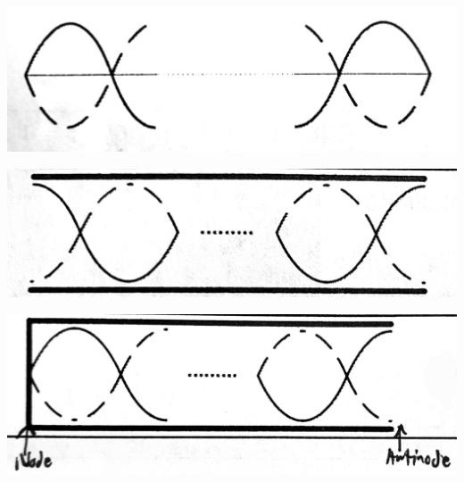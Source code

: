 \documentclass[oneside]{book}
\begin{document}
\begin{itemize}
\begin{minipage}{0.3\textwidth}
\begin{center}
            \includegraphics[scale=0.1]{../images/StringStatWaves.jpg}
            \captionsetup{type=figure}
        \end{center}
    \end{minipage}
    \begin{minipage}{0.3\textwidth}
        \begin{center}
            \hypertarget{Fig 12.3}{}
            \includegraphics[scale=0.1]{../images/Open Pipe.jpg}
            \captionsetup{type=figure}
        \end{center}
    \end{minipage}
    \begin{minipage}{0.3\textwidth}
        \vspace{7mm}
        \begin{center}
            \hypertarget{Fig 12.4}{}
            \includegraphics[scale=0.1]{../images/Pipe Closed at One End.jpg}
            \captionsetup{type=figure}
        \end{center}
    \end{minipage}

\end{itemize}
\end{document}
